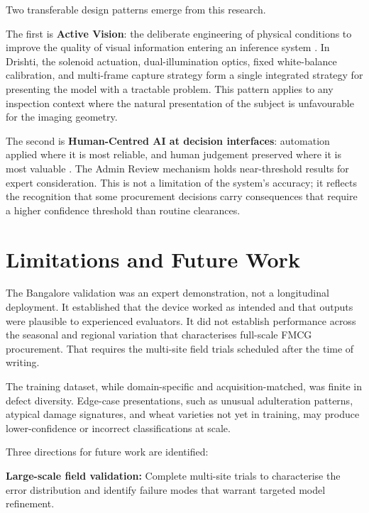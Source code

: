 Two transferable design patterns emerge from this research.

The first is \textbf{Active Vision}: the deliberate engineering of physical conditions to improve the quality of visual information entering an inference system \cite{Aloimonos1988}. In Drishti, the solenoid actuation, dual-illumination optics, fixed white-balance calibration, and multi-frame capture strategy form a single integrated strategy for presenting the model with a tractable problem. This pattern applies to any inspection context where the natural presentation of the subject is unfavourable for the imaging geometry.

The second is \textbf{Human-Centred AI at decision interfaces}: automation applied where it is most reliable, and human judgement preserved where it is most valuable \cite{Shneiderman2020}. The Admin Review mechanism holds near-threshold results for expert consideration. This is not a limitation of the system's accuracy; it reflects the recognition that some procurement decisions carry consequences that require a higher confidence threshold than routine clearances.

\section{Limitations and Future Work}

The Bangalore validation was an expert demonstration, not a longitudinal deployment. It established that the device worked as intended and that outputs were plausible to experienced evaluators. It did not establish performance across the seasonal and regional variation that characterises full-scale FMCG procurement. That requires the multi-site field trials scheduled after the time of writing.

The training dataset, while domain-specific and acquisition-matched, was finite in defect diversity. Edge-case presentations, such as unusual adulteration patterns, atypical damage signatures, and wheat varieties not yet in training, may produce lower-confidence or incorrect classifications at scale.

Three directions for future work are identified:

\textbf{Large-scale field validation:} Complete multi-site trials to characterise the error distribution and identify failure modes that warrant targeted model refinement.

